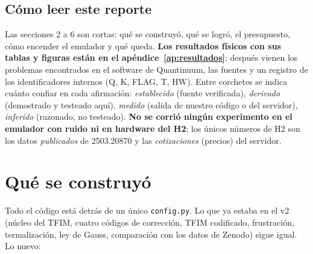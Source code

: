 \documentclass[11pt,a4paper]{article}
\begin{document}
\subsection{C\'omo leer este reporte}
Las secciones 2 a 6 son cortas: qu\'e se construy\'o, qu\'e se logr\'o, el presupuesto, c\'omo encender el
emulador y qu\'e queda. \textbf{Los resultados f\'isicos con sus tablas y figuras est\'an en el
ap\'endice~\ref{ap:resultados}}; despu\'es vienen los problemas encontrados en el software de Quantinuum,
las fuentes y un registro de los identificadores internos (Q, K, FLAG, T, HW). Entre corchetes se
indica cu\'anto confiar en cada afirmaci\'on: \emph{establecido} (fuente verificada), \emph{derivado}
(demostrado y testeado aqu\'i), \emph{medido} (salida de nuestro c\'odigo o del servidor),
\emph{inferido} (razonado, no testeado). \textbf{No se corri\'o ning\'un experimento en el emulador con
ruido ni en hardware del H2}; los \'unicos n\'umeros de H2 son los datos \emph{publicados} de 2503.20870
y las \emph{cotizaciones} (precios) del servidor.

\section{Qu\'e se construy\'o}

Todo el c\'odigo est\'a detr\'as de un \'unico \texttt{config.py}. Lo que ya estaba en el v2 (n\'ucleo del TFIM,
cuatro c\'odigos de correcci\'on, TFIM codificado, frustraci\'on, termalizaci\'on, ley de Gauss, comparaci\'on
con los datos de Zenodo) sigue igual. Lo nuevo:
\end{document}
